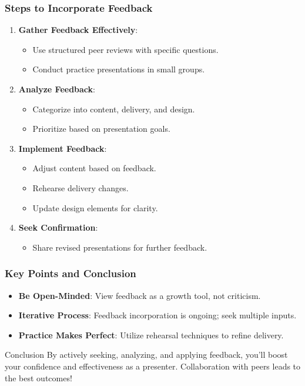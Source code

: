 \documentclass[aspectratio=169]{beamer}
\begin{document}
\begin{frame}[fragile]
    \frametitle{Steps to Incorporate Feedback}
    \begin{enumerate}
        \item \textbf{Gather Feedback Effectively}:
            \begin{itemize}
                \item Use structured peer reviews with specific questions.
                \item Conduct practice presentations in small groups.
            \end{itemize}
        \item \textbf{Analyze Feedback}:
            \begin{itemize}
                \item Categorize into content, delivery, and design.
                \item Prioritize based on presentation goals.
            \end{itemize}
        \item \textbf{Implement Feedback}:
            \begin{itemize}
                \item Adjust content based on feedback.
                \item Rehearse delivery changes.
                \item Update design elements for clarity.
            \end{itemize}
        \item \textbf{Seek Confirmation}:
            \begin{itemize}
                \item Share revised presentations for further feedback.
            \end{itemize}
    \end{enumerate}
\end{frame}

\begin{frame}[fragile]
    \frametitle{Key Points and Conclusion}
    \begin{itemize}
        \item \textbf{Be Open-Minded}: View feedback as a growth tool, not criticism.
        \item \textbf{Iterative Process}: Feedback incorporation is ongoing; seek multiple inputs.
        \item \textbf{Practice Makes Perfect}: Utilize rehearsal techniques to refine delivery.
    \end{itemize}
    
    \begin{block}{Conclusion}
        By actively seeking, analyzing, and applying feedback, you'll boost your confidence and effectiveness as a presenter. Collaboration with peers leads to the best outcomes!
    \end{block}
\end{frame}
\end{document}
